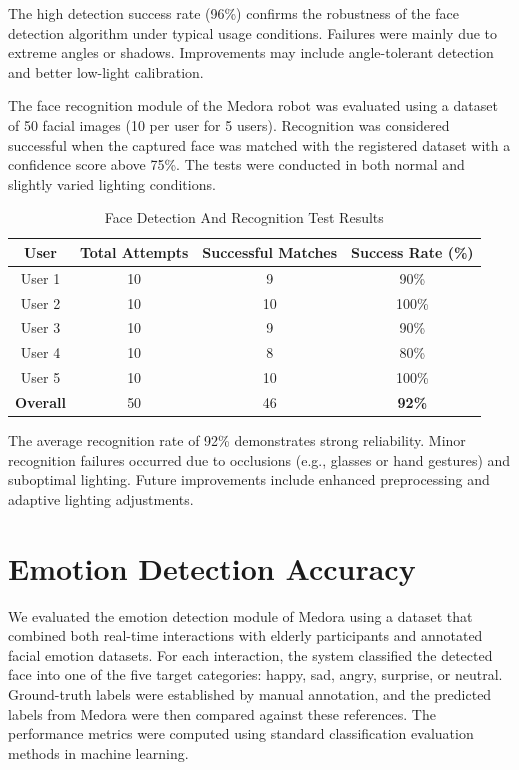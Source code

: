 The high detection success rate (96\%) confirms the robustness of the face detection algorithm under typical usage conditions. Failures were mainly due to extreme angles or shadows. Improvements may include angle-tolerant detection and better low-light calibration.


The face recognition module of the Medora robot was evaluated using a dataset of 50 facial images (10 per user for 5 users). Recognition was considered successful when the captured face was matched with the registered dataset with a confidence score above 75\%. The tests were conducted in both normal and slightly varied lighting conditions.

\begin{table}[h!]
\centering
\caption{Face Detection And Recognition Test Results}
\begin{tabular}{|c|c|c|c|}
\hline
\textbf{User} & \textbf{Total Attempts} & \textbf{Successful Matches} & \textbf{Success Rate (\%)} \\
\hline
User 1 & 10 & 9 & 90\% \\
User 2 & 10 & 10 & 100\% \\
User 3 & 10 & 9 & 90\% \\
User 4 & 10 & 8 & 80\% \\
User 5 & 10 & 10 & 100\% \\
\hline
\textbf{Overall} & 50 & 46 & \textbf{92\%} \\
\hline
\end{tabular}
\end{table}

The average recognition rate of 92\% demonstrates strong reliability. Minor recognition failures occurred due to occlusions (e.g., glasses or hand gestures) and suboptimal lighting. Future improvements include enhanced preprocessing and adaptive lighting adjustments.






\section{Emotion Detection Accuracy}

We evaluated the emotion detection module of Medora using a dataset that combined both 
real-time interactions with elderly participants and annotated facial emotion datasets. 
For each interaction, the system classified the detected face into one of the five target 
categories: happy, sad, angry, surprise, or neutral. Ground-truth labels were established 
by manual annotation, and the predicted labels from Medora were then compared against 
these references. The performance metrics were computed using standard classification 
evaluation methods in machine learning.

